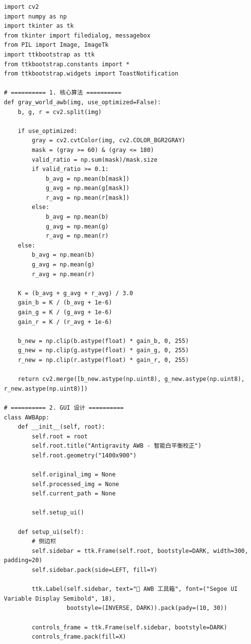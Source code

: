\documentclass[12pt,a4paper,UTF8]{ctexart} %
\begin{document}
\begin{lstlisting}[caption={AWB可视化GUI代码（awb\_gui.py）}, label=code:gui]
import cv2
import numpy as np
import tkinter as tk
from tkinter import filedialog, messagebox
from PIL import Image, ImageTk
import ttkbootstrap as ttk
from ttkbootstrap.constants import *
from ttkbootstrap.widgets import ToastNotification

# ========== 1. 核心算法 ==========
def gray_world_awb(img, use_optimized=False):
    b, g, r = cv2.split(img)
    
    if use_optimized:
        gray = cv2.cvtColor(img, cv2.COLOR_BGR2GRAY)
        mask = (gray >= 60) & (gray <= 180)
        valid_ratio = np.sum(mask)/mask.size
        if valid_ratio >= 0.1:
            b_avg = np.mean(b[mask])
            g_avg = np.mean(g[mask])
            r_avg = np.mean(r[mask])
        else:
            b_avg = np.mean(b)
            g_avg = np.mean(g)
            r_avg = np.mean(r)
    else:
        b_avg = np.mean(b)
        g_avg = np.mean(g)
        r_avg = np.mean(r)
    
    K = (b_avg + g_avg + r_avg) / 3.0
    gain_b = K / (b_avg + 1e-6)
    gain_g = K / (g_avg + 1e-6)
    gain_r = K / (r_avg + 1e-6)
    
    b_new = np.clip(b.astype(float) * gain_b, 0, 255)
    g_new = np.clip(g.astype(float) * gain_g, 0, 255)
    r_new = np.clip(r.astype(float) * gain_r, 0, 255)
    
    return cv2.merge([b_new.astype(np.uint8), g_new.astype(np.uint8), r_new.astype(np.uint8)])

# ========== 2. GUI 设计 ==========
class AWBApp:
    def __init__(self, root):
        self.root = root
        self.root.title("Antigravity AWB - 智能白平衡校正")
        self.root.geometry("1400x900")
        
        self.original_img = None
        self.processed_img = None
        self.current_path = None
        
        self.setup_ui()

    def setup_ui(self):
        # 侧边栏
        self.sidebar = ttk.Frame(self.root, bootstyle=DARK, width=300, padding=20)
        self.sidebar.pack(side=LEFT, fill=Y)
        
        ttk.Label(self.sidebar, text="🎨 AWB 工具箱", font=("Segoe UI Variable Display Semibold", 18), 
                  bootstyle=(INVERSE, DARK)).pack(pady=(10, 30))
        
        controls_frame = ttk.Frame(self.sidebar, bootstyle=DARK)
        controls_frame.pack(fill=X)
        

\end{lstlisting}
\end{document}
